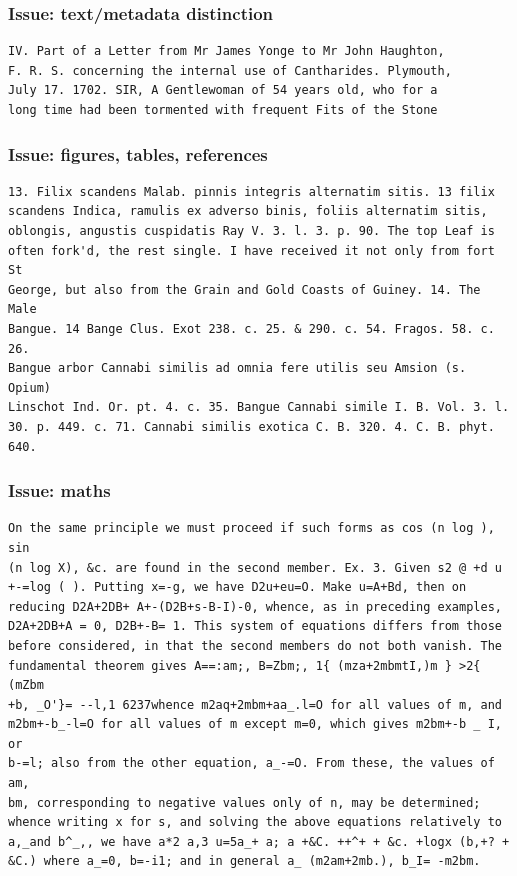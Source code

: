 \documentclass{beamer}       %
\begin{document}
\begin{frame}[fragile]
\frametitle{Issue: text\slash metadata distinction}
\begin{verbatim}
IV. Part of a Letter from Mr James Yonge to Mr John Haughton, 
F. R. S. concerning the internal use of Cantharides. Plymouth, 
July 17. 1702. SIR, A Gentlewoman of 54 years old, who for a 
long time had been tormented with frequent Fits of the Stone
\end{verbatim}
\end{frame}

\begin{frame}[fragile]
\frametitle{Issue: figures, tables, references}
\footnotesize
\begin{verbatim}
13. Filix scandens Malab. pinnis integris alternatim sitis. 13 filix 
scandens Indica, ramulis ex adverso binis, foliis alternatim sitis, 
oblongis, angustis cuspidatis Ray V. 3. l. 3. p. 90. The top Leaf is 
often fork'd, the rest single. I have received it not only from fort St 
George, but also from the Grain and Gold Coasts of Guiney. 14. The Male 
Bangue. 14 Bange Clus. Exot 238. c. 25. & 290. c. 54. Fragos. 58. c. 26. 
Bangue arbor Cannabi similis ad omnia fere utilis seu Amsion (s. Opium) 
Linschot Ind. Or. pt. 4. c. 35. Bangue Cannabi simile I. B. Vol. 3. l. 
30. p. 449. c. 71. Cannabi similis exotica C. B. 320. 4. C. B. phyt. 
640. 
\end{verbatim}
\end{frame}

\begin{frame}[fragile]
\frametitle{Issue: maths}
\footnotesize
\begin{verbatim}
On the same principle we must proceed if such forms as cos (n log ), sin
(n log X), &c. are found in the second member. Ex. 3. Given s2 @ +d u 
+-=log ( ). Putting x=-g, we have D2u+eu=O. Make u=A+Bd, then on 
reducing D2A+2DB+ A+-(D2B+s-B-I)-0, whence, as in preceding examples, 
D2A+2DB+A = 0, D2B+-B= 1. This system of equations differs from those 
before considered, in that the second members do not both vanish. The 
fundamental theorem gives A==:am;, B=Zbm;, 1{ (mza+2mbmtI,)m } >2{ (mZbm
+b, _O'}= --l,1 6237whence m2aq+2mbm+aa_.l=O for all values of m, and 
m2bm+-b_-l=O for all values of m except m=0, which gives m2bm+-b _ I, or
b-=l; also from the other equation, a_-=O. From these, the values of am,
bm, corresponding to negative values only of n, may be determined; 
whence writing x for s, and solving the above equations relatively to 
a,_and b^_,, we have a*2 a,3 u=5a_+ a; a +&C. ++^+ + &c. +logx (b,+? + 
&C.) where a_=0, b=-i1; and in general a_ (m2am+2mb.), b_I= -m2bm. 
\end{verbatim}
\end{frame}
\end{document}
